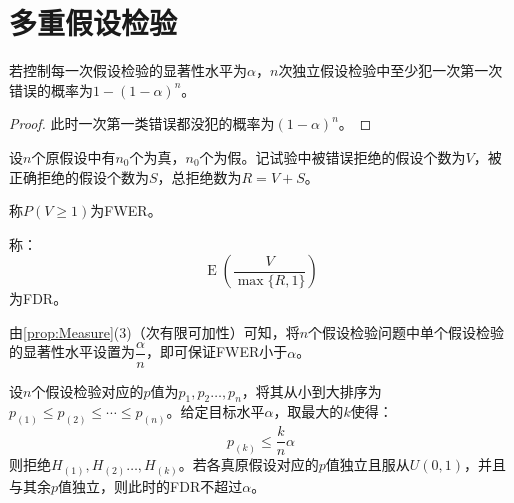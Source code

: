 \section{多重假设检验}
\begin{property}
	若控制每一次假设检验的显著性水平为$\alpha$，$n$次独立假设检验中至少犯一次第一次错误的概率为$1-(1-\alpha)^n$。
\end{property}
\begin{proof}
	此时一次第一类错误都没犯的概率为$(1-\alpha)^n$。
\end{proof}
设$n$个原假设中有$n_0$个为真，$n_0$个为假。记试验中被错误拒绝的假设个数为$V$，被正确拒绝的假设个数为$S$，总拒绝数为$R=V+S$。
\begin{definition}
	称$P(V\geqslant1)$为\gls{FWER}。
\end{definition}
\begin{definition}
	称：
	\begin{equation*}
		\operatorname{E}\left(\frac{V}{\max\{R,1\}}\right)
	\end{equation*}
	为\gls{FDR}。
\end{definition}
\begin{method}[BonFerroni]
	由\cref{prop:Measure}(3)（次有限可加性）可知，将$n$个假设检验问题中单个假设检验的显著性水平设置为$\dfrac{\alpha}{n}$，即可保证FWER小于$\alpha$。
\end{method}
\begin{method}
	设$n$个假设检验对应的$p$值为$p_1,p_2\dots,p_n$，将其从小到大排序为$p_{(1)}\leqslant p_{(2)}\leqslant\cdots\leqslant p_{(n)}$。给定目标水平$\alpha$，取最大的$k$使得：
	\begin{equation*}
		p_{(k)}\leqslant\frac{k}{n}\alpha
	\end{equation*}
	则拒绝$H_{(1)},H_{(2)}\dots,H_{(k)}$。若各真原假设对应的$p$值独立且服从$U(0,1)$，并且与其余$p$值独立，则此时的FDR不超过$\alpha$。
\end{method}
